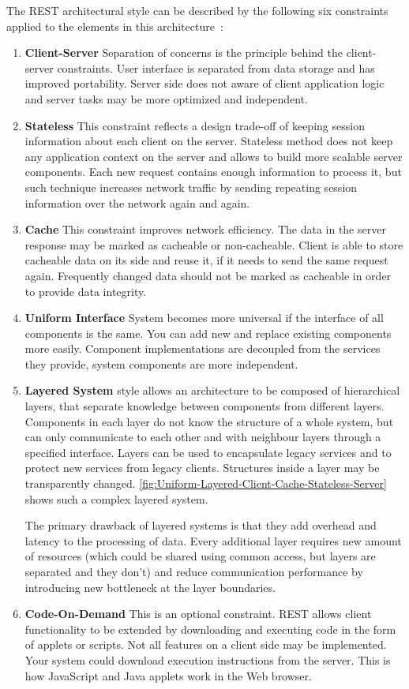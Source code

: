 The REST architectural style can be described by the following six constraints
applied to the elements in this architecture~\cite{Fielding2000}:
\begin{enumerate}
  \item \textbf{Client-Server}
  Separation of concerns is the principle behind the client-server constraints.
  User interface is separated from data storage and has improved portability.
  Server side does not aware of client application logic and server tasks may be
  more optimized and independent.
  \item \textbf{Stateless}
  This constraint reflects a design trade-off of keeping session
  information about each client on the server. Stateless method does not keep
  any application context on the server and allows to build more scalable server
  components. Each new request contains enough information to process it, but
  such technique increases network traffic by sending repeating session
  information over the network again and again.
  \item \textbf{Cache}
  This constraint improves network efficiency. The data in the server response
  may be marked as cacheable or non-cacheable. Client is able to store cacheable
  data on its side and reuse it, if it needs to send the same request again.
  Frequently changed data should not be marked as cacheable in order to provide
  data integrity.
  \item \textbf{Uniform Interface}
  System becomes more universal if the interface of all components is the same.
  You can add new and replace existing components more easily. Component
  implementations are decoupled from the services they provide, system
  components are more independent. 
  \item \textbf{Layered System} style allows an architecture to be composed of hierarchical
  layers, that separate knowledge between components from different layers.
  Components in each layer do not know the structure of a whole system, but can
  only communicate to each other and with neighbour layers through a specified
  interface. Layers can be used to encapsulate legacy services and to protect
  new services from legacy clients. Structures inside a layer may be
  transparently changed.
  \autoref{fig:Uniform-Layered-Client-Cache-Stateless-Server} shows such a
  complex layered system.
  
  The primary drawback of layered systems is that they add overhead and latency
  to the processing of data. Every additional layer requires new amount of
  resources (which could be shared using common access, but layers are
  separated and they don't) and reduce communication performance by introducing
  new bottleneck at the layer boundaries.
  \item \textbf{Code-On-Demand}
  This is an optional constraint. REST allows client functionality to be extended
  by downloading and executing code in the form of applets or scripts. Not all
  features on a client side may be implemented. Your system could download
  execution instructions from the server. This is how JavaScript and Java
  applets work in the Web browser.
 
\end{enumerate}




